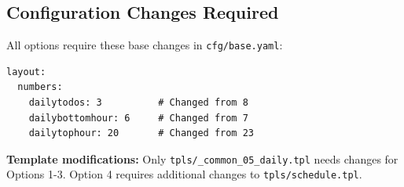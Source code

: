 \documentclass[12pt]{article}
\begin{document}
\vspace{5mm}

\subsection*{Configuration Changes Required}

All options require these base changes in \texttt{cfg/base.yaml}:

\begin{verbatim}
layout:
  numbers:
    dailytodos: 3          # Changed from 8
    dailybottomhour: 6     # Changed from 7
    dailytophour: 20       # Changed from 23
\end{verbatim}

\textbf{Template modifications:} Only \texttt{tpls/\_common\_05\_daily.tpl} needs changes for Options 1-3. Option 4 requires additional changes to \texttt{tpls/schedule.tpl}.
\end{document}
